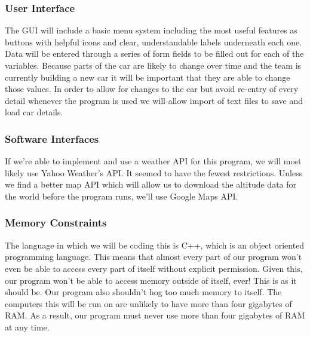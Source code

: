 \documentclass[onecolumn, draftclsnofoot,10pt, compsoc]{IEEEtran}
\begin{document}
\begin{singlespace}
        \subsubsection{User Interface}      %
        The GUI will include a basic menu system including the most useful features as buttons with helpful icons and clear, understandable labels underneath each one. 
        Data will be entered through a series of form fields to be filled out for each of the variables. 
        Because parts of the car are likely to change over time and the team is currently building a new car it will be important that they are able to change those values. 
        In order to allow for changes to the car but avoid re-entry of every detail whenever the program is used we will allow import of text files to save and load car details.
        
        \subsubsection{Software Interfaces} %
        If we're able to implement and use a weather API for this program, we will most likely use Yahoo Weather's API. It seemed to have the fewest restrictions.
        Unless we find a better map API which will allow us to download the altitude data for the world before the program runs, we'll use Google Maps API.
        
        \subsubsection{Memory Constraints}  %
        The language in which we will be coding this is C++, which is an object oriented programming language. This means that almost every part of our program won't even be able to access every part of itself without explicit permission. Given this, our program won't be able to access memory outside of itself, ever! This is as it should be. Our program also shouldn't hog too much memory to itself. The computers this will be run on are unlikely to have more than four gigabytes of RAM. As a result, our program must never use more than four gigabytes of RAM at any time.
    

\end{singlespace}
\end{document}
